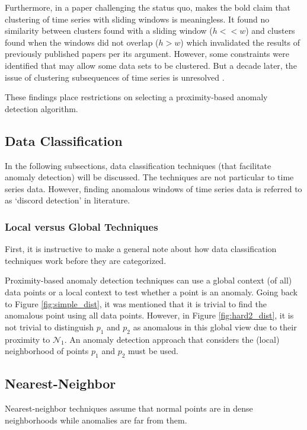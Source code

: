 Furthermore, in a paper challenging the status quo, \cite{Keogh2004} makes the bold claim that clustering of time series with sliding windows is meaningless. It found no similarity between clusters found with a sliding window ($h<<w$) and clusters found when the windows did not overlap ($h>w$) which invalidated the results of previously published papers per its argument. However, some constraints were identified that may allow some data sets to be clustered. But a decade later, the issue of clustering subsequences of time series is unresolved \cite{Zolhavarieh2014}.

These findings place restrictions on selecting a proximity-based anomaly detection algorithm.


\subsection{Data Classification}

In the following subsections, data classification techniques (that facilitate anomaly detection) will be discussed. The techniques are not particular to time series data. However, finding anomalous windows of time series data is referred to as `discord detection' in literature.

\subsubsection{Local versus Global Techniques}

First, it is instructive to make a general note about how data classification techniques work before they are categorized.

Proximity-based anomaly detection techniques can use a global context (of all) data points or a local context to test whether a point is an anomaly. Going back to Figure \ref{fig:simple_dist}, it was mentioned that it is trivial to find the anomalous point using all data points. However, in Figure \ref{fig:hard2_dist}, it is not trivial to distinguish $p_1$ and $p_2$ as anomalous in this global view due to their proximity to $\mathcal{N}_1$. An anomaly detection approach that considers the (local) neighborhood of points $p_1$ and $p_2$ must be used.

\subsection{Nearest-Neighbor}

Nearest-neighbor techniques assume that normal points are in dense neighborhoods while anomalies are far from them.

